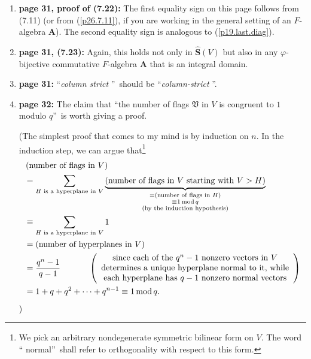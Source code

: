 \documentclass[numbers=enddot,12pt,final,onecolumn,notitlepage]{scrartcl}%
\theoremstyle{definition}
\let\sumnonlimits\sum
\renewcommand{\sum}{\sumnonlimits\limits}
\begin{document}
\begin{enumerate}
\item \textbf{page 31, proof of (7.22):} The first equality sign on this page
follows from (7.11) (or from (\ref{p26.7.11}), if you are working in the
general setting of an $F$-algebra $\mathbf{A}$). The second equality sign is
analogous to (\ref{p19.last.diag}).

\item \textbf{page 31, (7.23):} Again, this holds not only in
$\widehat{\mathbf{S}}\left(  V\right)  $ but also in any $\varphi$-bijective
commutative $F$-algebra $\mathbf{A}$ that is an integral domain.

\item \textbf{page 31:} \textquotedblleft\textit{column strict}%
\textquotedblright\ should be \textquotedblleft\textit{column-strict}%
\textquotedblright.

\item \textbf{page 32:} The claim that \textquotedblleft the number of flags
$\mathfrak{V}$ in $V$ is congruent to $1$ modulo $q$\textquotedblright\ is
worth giving a proof.

(The simplest proof that comes to my mind is by induction on $n$. In the
induction step, we can argue that\footnote{We pick an arbitrary nondegenerate
symmetric bilinear form on $V$. The word \textquotedblleft
normal\textquotedblright\ shall refer to orthogonality with respect to this
form.}
\begin{align*}
&  \left(  \text{number of flags in }V\right) \\
&  =\sum_{H\text{ is a hyperplane in }V}\underbrace{\left(  \text{number of
flags in }V\text{ starting with }V>H\right)  }_{\substack{=\left(
\text{number of flags in }H\right)  \\\equiv1\operatorname{mod}q\\\text{(by
the induction hypothesis)}}}\\
&  \equiv\sum_{H\text{ is a hyperplane in }V}1\\
&  =\left(  \text{number of hyperplanes in }V\right) \\
&  =\dfrac{q^{n}-1}{q-1}\ \ \ \ \ \ \ \ \ \ \left(
\begin{array}
[c]{c}%
\text{since each of the }q^{n}-1\text{ nonzero vectors in }V\\
\text{determines a unique hyperplane normal to it, while}\\
\text{each hyperplane has }q-1\text{ nonzero normal vectors}%
\end{array}
\right) \\
&  =1+q+q^{2}+\cdots+q^{n-1}\equiv1\operatorname{mod}q.
\end{align*}
)


\end{enumerate}
\end{document}
